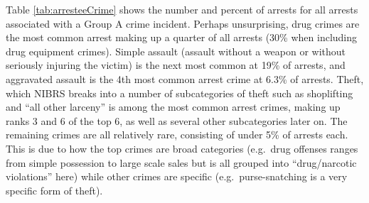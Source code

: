 \documentclass[
]{krantz}
\begin{document}
Table \ref{tab:arresteeCrime} shows the number and percent
of arrests for all arrests associated with a Group A crime
incident. Perhaps unsurprising, drug crimes are the most
common arrest making up a quarter of all arrests (30\% when
including drug equipment crimes). Simple assault (assault
without a weapon or without seriously injuring the victim)
is the next most common at 19\% of arrests, and aggravated
assault is the 4th most common arrest crime at 6.3\% of
arrests. Theft, which NIBRS breaks into a number of
subcategories of theft such as shoplifting and ``all other
larceny'' is among the most common arrest crimes, making up
ranks 3 and 6 of the top 6, as well as several other
subcategories later on. The remaining crimes are all
relatively rare, consisting of under 5\% of arrests each.
This is due to how the top crimes are broad categories
(e.g.~drug offenses ranges from simple possession to large
scale sales but is all grouped into ``drug/narcotic
violations'' here) while other crimes are specific
(e.g.~purse-snatching is a very specific form of theft).
\end{document}
